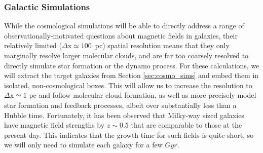 


\vspace{-3mm}
\subsubsection{Galactic Simulations}
\label{sec:molcloud_sims}
\vspace{-2mm}

While the cosmological simulations will be able to directly address a
range of observationally-motivated questions about magnetic fields in
galaxies, their relatively limited ($\Delta \mathrm{x} \simeq 100$~pc) spatial  resolution means that they only
 marginally resolve larger molecular clouds, and are far too
coarsely resolved to directly simulate star formation or the dynamo process.  
For these calculations, we will extract the target galaxies from Section
\ref{sec:cosmo_sims} and embed them in isolated, non-cosmological boxes.  
This will allow us to
increase the resolution to $\Delta \mathrm{x} \simeq 1$ pc and follow molecular cloud
formation, as well as more precisely model star formation and feedback
processes, albeit over substantially less than a Hubble time.
Fortunately, it has been observed that Milky-way sized galaxies have 
magnetic field strengths by $z\sim 0.5$ that are comparable to those
at the present day.  This indicates that the growth time
for such fields is quite short, so we will only need to simulate each galaxy for
a few $Gyr$.  

